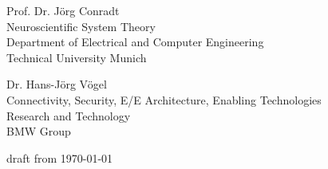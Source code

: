 \begin{titlepage}
\begin{center}
\vspace{1cm}

\begin{frame}

  \begin{minipage}{0.49\textwidth}
    \begin{center}
	  Prof. Dr. J{\"o}rg Conradt \\
	  Neuroscientific System Theory \\
	  Department of Electrical and Computer Engineering \\
	  Technical University Munich
	  \end{center}
  \end{minipage}
	\begin{minipage}{0.49\textwidth}
	  \begin{center}
    	  Dr. Hans-J{\"o}rg V{\"o}gel \\
	    Connectivity, Security, E/E Architecture, Enabling Technologies\\
	    Research and Technology\\
	    BMW Group 
	  \end{center}
  \end{minipage}
  
\end{frame}


\vspace{7\baselineskip}

draft from \today
\\
\thday{} \thmonth{} \thyear

\end{center}
\end{titlepage}
